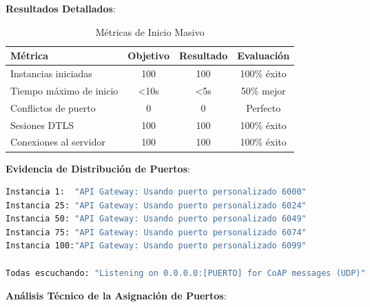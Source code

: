 \textbf{Resultados Detallados}:

\begin{table}[h]
\centering
\begin{tabular}{|l|c|c|c|}
\hline
\textbf{Métrica} & \textbf{Objetivo} & \textbf{Resultado} & \textbf{Evaluación} \\
\hline
Instancias iniciadas & 100 & 100 & \textcolor{successgreen}{100\% éxito} \\
Tiempo máximo de inicio & <10s & <5s & \textcolor{successgreen}{50\% mejor} \\
Conflictos de puerto & 0 & 0 & \textcolor{successgreen}{Perfecto} \\
Sesiones DTLS & 100 & 100 & \textcolor{successgreen}{100\% éxito} \\
Conexiones al servidor & 100 & 100 & \textcolor{successgreen}{100\% éxito} \\
\hline
\end{tabular}
\caption{Métricas de Inicio Masivo}
\label{tab:metricas-inicio-masivo}
\end{table}

\textbf{Evidencia de Distribución de Puertos}:
\begin{lstlisting}[language=bash,caption={Muestra de Asignación de Puertos},label={lst:asignacion-puertos}]
Instancia 1:  "API Gateway: Usando puerto personalizado 6000"
Instancia 25: "API Gateway: Usando puerto personalizado 6024"
Instancia 50: "API Gateway: Usando puerto personalizado 6049"
Instancia 75: "API Gateway: Usando puerto personalizado 6074"
Instancia 100:"API Gateway: Usando puerto personalizado 6099"

Todas escuchando: "Listening on 0.0.0.0:[PUERTO] for CoAP messages (UDP)"
\end{lstlisting}

\textbf{Análisis Técnico de la Asignación de Puertos}:

